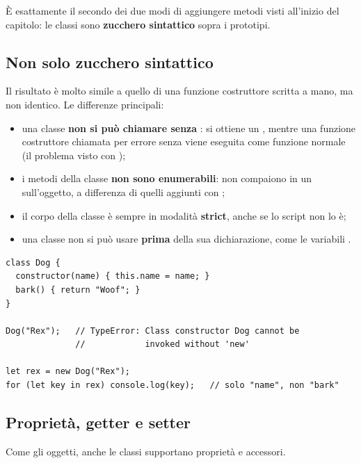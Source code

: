 È esattamente il secondo dei due modi di aggiungere metodi visti all'inizio del
capitolo: le classi sono \textbf{zucchero sintattico} sopra i prototipi.

\subsection{Non solo zucchero sintattico}

Il risultato è molto simile a quello di una funzione costruttore scritta a mano,
ma non identico. Le differenze principali:

\begin{itemize}
  \item una classe \textbf{non si può chiamare senza} : si ottiene un
        , mentre una funzione costruttore chiamata per errore
        senza  viene eseguita come funzione normale (il problema visto
        con );
  \item i metodi della classe \textbf{non sono enumerabili}: non compaiono in
        un  sull'oggetto, a differenza di quelli aggiunti con
        ;
  \item il corpo della classe è sempre in modalità \textbf{strict}, anche se lo
        script non lo è;
  \item una classe non si può usare \textbf{prima} della sua dichiarazione,
        come le variabili .
\end{itemize}

\begin{lstlisting}[style=js, name=classe-vs-funzione.js]
class Dog {
  constructor(name) { this.name = name; }
  bark() { return "Woof"; }
}

Dog("Rex");   // TypeError: Class constructor Dog cannot be
              //            invoked without 'new'

let rex = new Dog("Rex");
for (let key in rex) console.log(key);   // solo "name", non "bark"
\end{lstlisting}

\subsection{Proprietà, getter e setter}

Come gli oggetti, anche le classi supportano proprietà e accessori.

